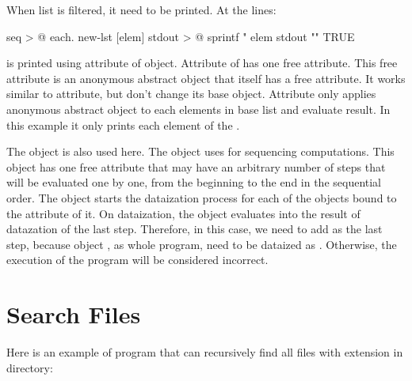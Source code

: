 \documentclass[12pt]{book}
\begin{document}
When list is filtered, it need to be printed. At the lines:
\begin{ffcode}
seq > @
  each.
    new-lst
    [elem]
      stdout > @
        sprintf
          "%
          elem
  stdout "\n"
  TRUE

\end{ffcode}
 is printed using  attribute of  object. Attribute  of  has one free attribute. This free attribute is an anonymous abstract object that itself has a free attribute. It works similar to  attribute, but  don't change its base  object. Attribute  only applies anonymous abstract object to each elements in base list and evaluate result. In this example it only prints each element of the .

The  object is also used here. The  object uses for sequencing computations. This object has one free attribute  that may have an arbitrary number of steps that will be evaluated one by one, from the beginning to the end in the sequential order. The  object starts the dataization process for each of the objects bound to the  attribute of it. On dataization, the  object evaluates into the result of datazation of the last step. Therefore, in this case, we need to add  as the last step, because object , as whole program, need to be dataized as . Otherwise, the execution of the program will be considered incorrect.


\section{Search Files}

Here is an example of program that can recursively find all files with  extension in directory:

\end{document}
